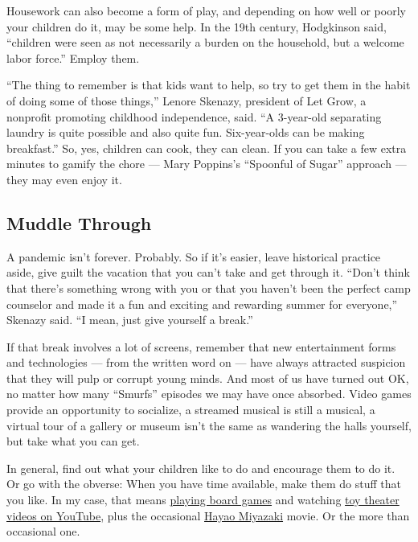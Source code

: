 Housework can also become a form of play, and depending on how well or
poorly your children do it, may be some help. In the 19th century,
Hodgkinson said, ``children were seen as not necessarily a burden on the
household, but a welcome labor force.'' Employ them.

``The thing to remember is that kids want to help, so try to get them in
the habit of doing some of those things,'' Lenore Skenazy, president of
Let Grow, a nonprofit promoting childhood independence, said. ``A
3-year-old separating laundry is quite possible and also quite fun.
Six-year-olds can be making breakfast.'' So, yes, children can cook,
they can clean. If you can take a few extra minutes to gamify the chore
--- Mary Poppins's ``Spoonful of Sugar'' approach --- they may even
enjoy it.

\hypertarget{muddle-through}{%
\subsection{Muddle Through}\label{muddle-through}}

A pandemic isn't forever. Probably. So if it's easier, leave historical
practice aside, give guilt the vacation that you can't take and get
through it. ``Don't think that there's something wrong with you or that
you haven't been the perfect camp counselor and made it a fun and
exciting and rewarding summer for everyone,'' Skenazy said. ``I mean,
just give yourself a break.''

If that break involves a lot of screens, remember that new entertainment
forms and technologies --- from the written word on --- have always
attracted suspicion that they will pulp or corrupt young minds. And most
of us have turned out OK, no matter how many ``Smurfs'' episodes we may
have once absorbed. Video games provide an opportunity to socialize, a
streamed musical is still a musical, a virtual tour of a gallery or
museum isn't the same as wandering the halls yourself, but take what you
can get.

In general, find out what your children like to do and encourage them to
do it. Or go with the obverse: When you have time available, make them
do stuff that you like. In my case, that means
\href{https://www.nytimes.com/2020/04/30/arts/board-games-soothing-virus.html}{playing
board games} and watching
\href{https://www.youtube.com/watch?v=bF7q37SfF4w}{toy theater videos on
YouTube}, plus the occasional
\href{https://www.nytimes.com/2020/05/27/movies/studio-ghibli-hbo-max.html}{Hayao
Miyazaki} movie. Or the more than occasional one.

